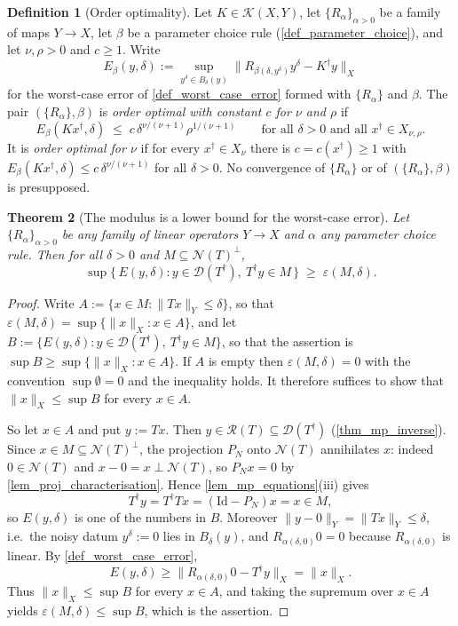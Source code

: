 \documentclass[a4paper]{report}
\theoremstyle{plain}
\newtheorem{theorem}{Theorem}[chapter]
\theoremstyle{definition}
\newtheorem{definition}[theorem]{Definition}
\theoremstyle{remark}
\newcommand{\Kk}{\mathcal{K}}
\newcommand{\Ran}{\mathcal{R}}
\newcommand{\Ker}{\mathcal{N}}
\newcommand{\Dom}{\mathcal{D}}
\newcommand{\Id}{\mathrm{Id}}
\newcommand{\dg}{^{\dagger}}
\begin{document}
\begin{definition}[Order optimality]
  \label{def_order_optimal}
  Let $K \in \Kk(X,Y)$, let $\{R_{\alpha}\}_{\alpha>0}$ be a family of maps $Y \to X$, let
  $\beta$ be a parameter choice rule (\cref{def_parameter_choice}), and let
  $\nu, \rho > 0$ and $c \ge 1$.  Write
  \[
    E_{\beta}(y,\delta) := \sup_{y^{\delta} \in B_{\delta}(y)}
      \bigl\| R_{\beta(\delta,y^{\delta})} y^{\delta} - K\dg y \bigr\|_X
  \]
  for the worst-case error of \cref{def_worst_case_error} formed with $\{R_{\alpha}\}$ and
  $\beta$.  The pair $(\{R_{\alpha}\}, \beta)$ is \emph{order optimal with constant $c$
  for $\nu$ and $\rho$} if
  \[
    E_{\beta}(Kx\dg, \delta) \;\le\; c\,\delta^{\nu/(\nu+1)}\rho^{1/(\nu+1)}
    \qquad \text{for all } \delta > 0 \text{ and all } x\dg \in X_{\nu,\rho} .
  \]
  It is \emph{order optimal for $\nu$} if for every $x\dg \in X_{\nu}$ there is
  $c = c(x\dg) \ge 1$ with $E_{\beta}(Kx\dg,\delta) \le c\,\delta^{\nu/(\nu+1)}$ for all
  $\delta > 0$.  No convergence of $\{R_{\alpha}\}$ or of $(\{R_{\alpha}\},\beta)$ is
  presupposed.
\end{definition}


\begin{theorem}[The modulus is a lower bound for the worst-case error]
  \label{thm_worstcase_lower}
  Let $\{R_{\alpha}\}_{\alpha>0}$ be any family of \emph{linear} operators $Y \to X$ and
  $\alpha$ any parameter choice rule.  Then for all $\delta > 0$ and
  $M \subseteq \Ker(T)^{\perp}$,
  \[
    \sup\{\, E(y,\delta) : y \in \Dom(T\dg),\ T\dg y \in M \,\}
      \;\ge\; \varepsilon(M,\delta) .
  \]
\end{theorem}

\begin{proof}
  Write $A := \{x \in M : \|Tx\|_Y \le \delta\}$, so that
  $\varepsilon(M,\delta) = \sup\{\|x\|_X : x \in A\}$, and let
  $B := \{E(y,\delta) : y \in \Dom(T\dg),\ T\dg y \in M\}$, so that the assertion is
  $\sup B \ge \sup\{\|x\|_X : x \in A\}$.  If $A$ is empty then
  $\varepsilon(M,\delta) = 0$ with the convention $\sup\emptyset = 0$ and the inequality
  holds.  It therefore suffices to show that $\|x\|_X \le \sup B$ for every $x \in A$.

  So let $x \in A$ and put $y := Tx$.  Then $y \in \Ran(T) \subseteq \Dom(T\dg)$
  (\cref{thm_mp_inverse}).  Since $x \in M \subseteq \Ker(T)^{\perp}$, the projection
  $P_N$ onto $\Ker(T)$ annihilates $x$: indeed $0 \in \Ker(T)$ and $x - 0 = x \perp
  \Ker(T)$, so $P_Nx = 0$ by \cref{lem_proj_characterisation}.  Hence
  \cref{lem_mp_equations}(iii) gives
  \[
    T\dg y = T\dg Tx = (\Id - P_N)x = x \in M ,
  \]
  so $E(y,\delta)$ is one of the numbers in $B$.  Moreover $\|y - 0\|_Y = \|Tx\|_Y \le
  \delta$, i.e.\ the noisy datum $y^{\delta} := 0$ lies in $B_{\delta}(y)$, and
  $R_{\alpha(\delta,0)}0 = 0$ because $R_{\alpha(\delta,0)}$ is linear.  By
  \cref{def_worst_case_error},
  \[
    E(y,\delta) \ge \|R_{\alpha(\delta,0)}0 - T\dg y\|_X = \|x\|_X .
  \]
  Thus $\|x\|_X \le \sup B$ for every $x \in A$, and taking the supremum over $x \in A$
  yields $\varepsilon(M,\delta) \le \sup B$, which is the assertion.
\end{proof}
\end{document}
